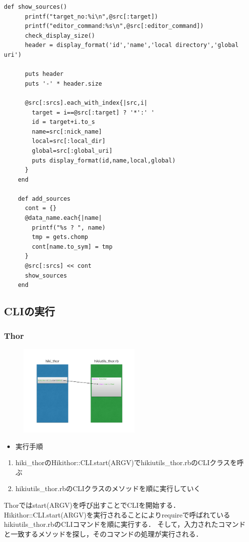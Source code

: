 \begin{lstlisting}[style=customRuby]
    def show_sources()
      printf("target_no:%i\n",@src[:target])
      printf("editor_command:%s\n",@src[:editor_command])
      check_display_size()
      header = display_format('id','name','local directory','global uri')

      puts header
      puts '-' * header.size

      @src[:srcs].each_with_index{|src,i|
        target = i==@src[:target] ? '*':' '
        id = target+i.to_s
        name=src[:nick_name]
        local=src[:local_dir]
        global=src[:global_uri]
        puts display_format(id,name,local,global)
      }
    end

    def add_sources
      cont = {}
      @data_name.each{|name|
        printf("%s ? ", name)
        tmp = gets.chomp
        cont[name.to_sym] = tmp
      }
      @src[:srcs] << cont
      show_sources
    end
\end{lstlisting}
\subsection{CLIの実行}
\subsubsection{Thor}
\begin{figure}[htbp]\begin{center}
\includegraphics[width=6cm,bb=0 0 442 500]{../figs/./hikiutils_yamane_09_copy.006.jpg}
\caption{}
\label{default}\end{center}\end{figure}\begin{itemize}
\item 実行手順
\end{itemize}\begin{enumerate}
\item hiki\_thorのHikithor::CLI.start(ARGV)でhikiutils\_thor.rbのCLIクラスを呼ぶ
\item hikiutils\_thor.rbのCLIクラスのメソッドを順に実行していく
\end{enumerate}
Thorではstart(ARGV)を呼び出すことでCLIを開始する．Hikithor::CLI.start(ARGV)を実行されることによりrequireで呼ばれているhikiutils\_thor.rbのCLIコマンドを順に実行する．
そして，入力されたコマンドと一致するメソッドを探し，そのコマンドの処理が実行される．

